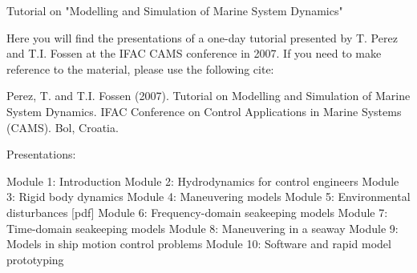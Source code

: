 Tutorial on "Modelling and Simulation of Marine System Dynamics"
 
Here you will find the presentations of a one-day tutorial presented by T. Perez and T.I. Fossen at the IFAC CAMS conference in 2007.   If you need to make reference to the material, please use the following cite:
 
Perez, T. and T.I. Fossen (2007). Tutorial on Modelling and Simulation of Marine System Dynamics. 
IFAC Conference on Control Applications in Marine Systems (CAMS). Bol, Croatia.

Presentations:
  
Module 1:    Introduction
Module 2:    Hydrodynamics for control engineers 
Module 3:    Rigid body dynamics 
Module 4:    Maneuvering models 
Module 5:    Environmental disturbances [pdf]
Module 6:    Frequency-domain seakeeping models 
Module 7:    Time-domain seakeeping models 
Module 8:    Maneuvering in a seaway 
Module 9:    Models in ship motion control problems 
Module 10:   Software and rapid model prototyping 